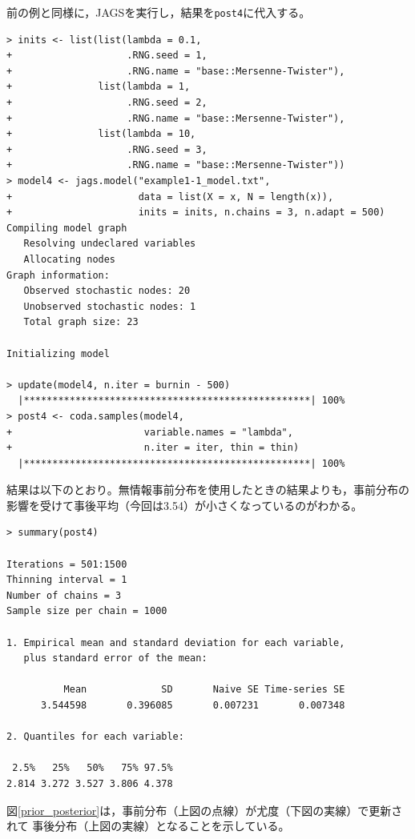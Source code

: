 \documentclass[11pt,uplatex]{jsarticle}
\begin{document}
前の例と同様に，\textsf{JAGS}を実行し，結果を\texttt{post4}に代入する。
%
\begin{lstlisting}
> inits <- list(list(lambda = 0.1,
+                    .RNG.seed = 1,
+                    .RNG.name = "base::Mersenne-Twister"),
+               list(lambda = 1,
+                    .RNG.seed = 2,
+                    .RNG.name = "base::Mersenne-Twister"),
+               list(lambda = 10,
+                    .RNG.seed = 3,
+                    .RNG.name = "base::Mersenne-Twister"))
> model4 <- jags.model("example1-1_model.txt",
+                      data = list(X = x, N = length(x)),
+                      inits = inits, n.chains = 3, n.adapt = 500)
Compiling model graph
   Resolving undeclared variables
   Allocating nodes
Graph information:
   Observed stochastic nodes: 20
   Unobserved stochastic nodes: 1
   Total graph size: 23

Initializing model

> update(model4, n.iter = burnin - 500)
  |**************************************************| 100%
> post4 <- coda.samples(model4,
+                       variable.names = "lambda",
+                       n.iter = iter, thin = thin)
  |**************************************************| 100%
\end{lstlisting}

結果は以下のとおり。無情報事前分布を使用したときの結果よりも，事前分布の
影響を受けて事後平均（今回は3.54）が小さくなっているのがわかる。

\begin{lstlisting}
> summary(post4)

Iterations = 501:1500
Thinning interval = 1 
Number of chains = 3 
Sample size per chain = 1000 

1. Empirical mean and standard deviation for each variable,
   plus standard error of the mean:

          Mean             SD       Naive SE Time-series SE 
      3.544598       0.396085       0.007231       0.007348 

2. Quantiles for each variable:

 2.5%   25%   50%   75% 97.5% 
2.814 3.272 3.527 3.806 4.378 

\end{lstlisting}

図\ref{prior_posterior}は，事前分布（上図の点線）が尤度（下図の実線）で更新されて
事後分布（上図の実線）となることを示している。
\end{document}
